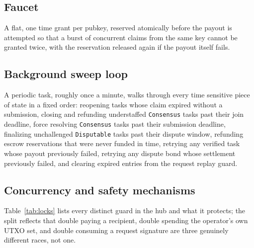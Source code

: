 \documentclass[11pt]{article}
\newcommand{\code}[1]{\texttt{#1}}
\begin{document}
\subsection{Faucet}

A flat, one time grant per pubkey, reserved atomically before the payout is attempted so that a burst of concurrent claims from the same key cannot be granted twice, with the reservation released again if the payout itself fails.

\subsection{Background sweep loop}

A periodic task, roughly once a minute, walks through every time sensitive piece of state in a fixed order: reopening tasks whose claim expired without a submission, closing and refunding understaffed \code{Consensus} tasks past their join deadline, force resolving \code{Consensus} tasks past their submission deadline, finalizing unchallenged \code{Disputable} tasks past their dispute window, refunding escrow reservations that were never funded in time, retrying any verified task whose payout previously failed, retrying any dispute bond whose settlement previously failed, and clearing expired entries from the request replay guard.

\subsection{Concurrency and safety mechanisms}

Table~\ref{tab:locks} lists every distinct guard in the hub and what it protects; the split reflects that double paying a recipient, double spending the operator's own UTXO set, and double consuming a request signature are three genuinely different races, not one.
\end{document}
